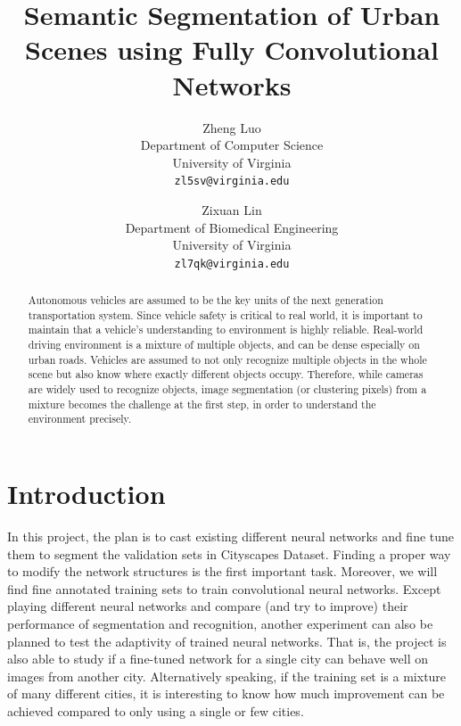 \documentclass[10pt,twocolumn,letterpaper]{article}
\begin{document}
\title{Semantic Segmentation of Urban Scenes using Fully Convolutional Networks}

\author{Zheng Luo\\
Department of Computer Science\\
University of Virginia\\
{\tt\small zl5sv@virginia.edu}
\and
Zixuan Lin\\
Department of Biomedical Engineering\\
University of Virginia\\
{\tt\small zl7qk@virginia.edu}
}

\maketitle

\begin{abstract}
   Autonomous vehicles are assumed to be the key units of the next generation transportation system. Since vehicle safety is critical to real world, it is important to maintain that a vehicle’s understanding to environment is highly reliable. Real-world driving environment is a mixture of multiple objects, and can be dense especially on urban roads. Vehicles are assumed to not only recognize multiple objects in the whole scene but also know where exactly different objects occupy. Therefore, while cameras are widely used to recognize objects, image segmentation (or clustering pixels) from a mixture becomes the challenge at the first step, in order to understand the environment precisely.
\end{abstract}




\section{Introduction}

In this project, the plan is to cast existing different neural networks and fine tune them to segment the validation sets in Cityscapes Dataset. Finding a proper way to modify the network structures is the first important task. Moreover, we will find fine annotated training sets to train convolutional neural networks. Except playing different neural networks and compare (and try to improve) their performance of segmentation and recognition, another experiment can also be planned to test the adaptivity of trained neural networks. That is, the project is also able to study if a fine-tuned network for a single city can behave well on images from another city. Alternatively speaking, if the training set is a mixture of many different cities, it is interesting to know how much improvement can be achieved compared to only using a single or few cities.
\end{document}
